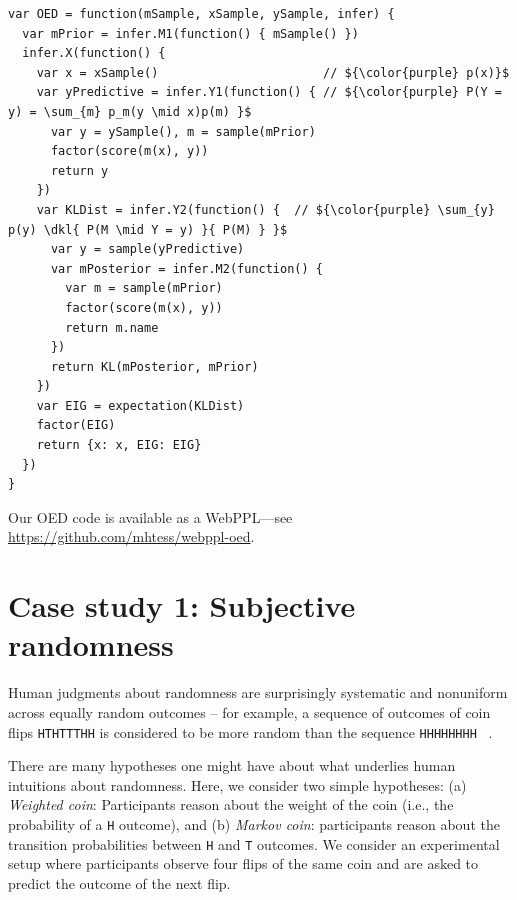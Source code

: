 \documentclass{article}
\newcommand{\dkl}{D_\mathrm{KL}\infdivx}
\begin{document}
\begin{lstlisting}[mathescape, label={code:oed-pp}, caption = {OED implementation. For clarity, we have omitted some book-keeping details.}]
var OED = function(mSample, xSample, ySample, infer) {
  var mPrior = infer.M1(function() { mSample() })
  infer.X(function() {
    var x = xSample()                       // ${\color{purple} p(x)}$
    var yPredictive = infer.Y1(function() { // ${\color{purple} P(Y = y) = \sum_{m} p_m(y \mid x)p(m) }$
      var y = ySample(), m = sample(mPrior)
      factor(score(m(x), y))
      return y
    })
    var KLDist = infer.Y2(function() {  // ${\color{purple} \sum_{y} p(y) \dkl{ P(M \mid Y = y) }{ P(M) } }$
      var y = sample(yPredictive)
      var mPosterior = infer.M2(function() {
        var m = sample(mPrior)
        factor(score(m(x), y))
        return m.name
      })
      return KL(mPosterior, mPrior)
    })
    var EIG = expectation(KLDist)
    factor(EIG)
    return {x: x, EIG: EIG}
  })
}
\end{lstlisting}
Our OED code is available as a WebPPL---see \url{https://github.com/mhtess/webppl-oed}.

\section{Case study 1: Subjective randomness}
\label{s:tutorial}

Human judgments about randomness are surprisingly systematic and nonuniform across equally random outcomes -- for example, a sequence of outcomes of coin flips \lstinline{HTHTTTHH} is considered to be more random than the sequence \lstinline{HHHHHHHH} ~\cite{goodfellow38:jep, griffiths01:cogsci}.

There are many hypotheses one might have about what underlies human intuitions about randomness.
Here, we consider two simple hypotheses: (a) \emph{Weighted coin}: Participants reason about the weight of the coin (i.e., the probability of a \lstinline{H} outcome), and (b) \emph{Markov coin}: participants reason about the transition probabilities between \lstinline{H} and \lstinline{T} outcomes.
We consider an experimental setup where participants observe four flips of the same coin and are asked to predict the outcome of the next flip.
\end{document}
